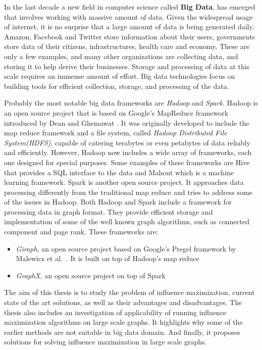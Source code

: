 \documentclass[english]{tktltiki}
\begin{document}
In the last decade a new field in computer science called \textbf{Big Data}, has emerged that involves working with massive amount of data. 
Given the widespread usage of internet, it is no surprise that a large amount of data is being generated daily. 
Amazon, Facebook and Twitter store information about their users, governments store data of their citizens, infrastructures, health care and economy. 
These are only a few examples, and many other organizations are collecting data, and storing it to help derive their businesses.
Storage and processing of data at this scale requires an immense amount of effort. 
Big data technologies focus on building tools for efficient collection, storage, and processing of the data. 

Probably the most notable big data frameworks are \textit{Hadoop} and \textit{Spark}. 
Hadoop is an open source project that is based on Google's MapReduce framework introduced by Dean and Ghemawat \cite{dean04}. 
It was originally developed to include the map reduce framework and a file system, called \textit{Hadoop Distributed File System(HDFS)}, capable of catering terabytes or even petabytes of data reliably and efficiently.
However, Hadoop now includes a wide array of frameworks, each one designed for special purposes. 
Some examples of these frameworks are Hive that provides a SQL interface to the data and Mahout which is a machine learning framework.
Spark is another open source project. 
It approaches data processing differently from the traditional map reduce and tries to address some of the issues in Hadoop.
Both Hadoop and Spark include a framework for processing data in graph format. 
They provide efficient storage and implementation of some of the well known graph algorithms, such as connected component and page rank.
These frameworks are:
\begin{itemize}
\item 
\textit{Giraph}, an open source project based on Google's Pregel framework by Malewicz et al.\ \cite{malewicz10}. It is built on top of Hadoop's map reduce
\item 
\textit{GraphX}, an open source project on top of Spark
\end{itemize}

The aim of this thesis is to study the problem of influence maximization, current state of the art solutions, as well as their advantages and disadvantages.
The thesis also includes an investigation of applicability of running influence maximization algorithms on large scale graphs. 
It highlights why some of the earlier methods are not suitable in big data domain. 
And finally, it proposes solutions for solving influence maximization in large scale graphs. 
\end{document}
